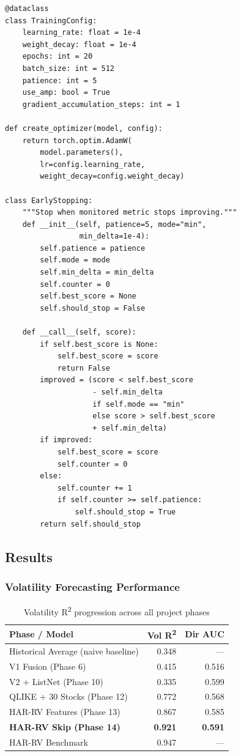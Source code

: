 \begin{lstlisting}[caption={Training infrastructure (src/train/common.py)}]
@dataclass
class TrainingConfig:
    learning_rate: float = 1e-4
    weight_decay: float = 1e-4
    epochs: int = 20
    batch_size: int = 512
    patience: int = 5
    use_amp: bool = True
    gradient_accumulation_steps: int = 1

def create_optimizer(model, config):
    return torch.optim.AdamW(
        model.parameters(),
        lr=config.learning_rate,
        weight_decay=config.weight_decay)

class EarlyStopping:
    """Stop when monitored metric stops improving."""
    def __init__(self, patience=5, mode="min",
                 min_delta=1e-4):
        self.patience = patience
        self.mode = mode
        self.min_delta = min_delta
        self.counter = 0
        self.best_score = None
        self.should_stop = False

    def __call__(self, score):
        if self.best_score is None:
            self.best_score = score
            return False
        improved = (score < self.best_score
                    - self.min_delta
                    if self.mode == "min"
                    else score > self.best_score
                    + self.min_delta)
        if improved:
            self.best_score = score
            self.counter = 0
        else:
            self.counter += 1
            if self.counter >= self.patience:
                self.should_stop = True
        return self.should_stop
\end{lstlisting}

\subsection{Results}

\subsubsection{Volatility Forecasting Performance}

\begin{table}[H]
\centering
\caption{Volatility R\textsuperscript{2} progression across all project phases}
\begin{tabular}{lrr}
\toprule
\textbf{Phase / Model} & \textbf{Vol R\textsuperscript{2}} & \textbf{Dir AUC} \\
\midrule
Historical Average (naive baseline) & 0.348 & --- \\
V1 Fusion (Phase 6)                 & 0.415 & 0.516 \\
V2 + ListNet (Phase 10)             & 0.335 & 0.599 \\
QLIKE + 30 Stocks (Phase 12)        & 0.772 & 0.568 \\
HAR-RV Features (Phase 13)          & 0.867 & 0.585 \\
\textbf{HAR-RV Skip (Phase 14)}     & \textbf{0.921} & \textbf{0.591} \\
HAR-RV Benchmark                    & 0.947 & --- \\
\bottomrule
\end{tabular}
\end{table}


